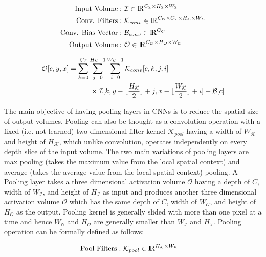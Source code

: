 \begin{align}
\text{Input Volume}:&~ \mathcal{I} \in \mathcal{\rm I\!R}^{C_{\mathcal{I}} \times H_{\mathcal{I}} \times W_{\mathcal{I}}}\\
\text{Conv. Filters}:&~ \mathcal{K}_{conv} \in \mathcal{\rm I\!R}^{C_{\mathcal{O}} \times C_{\mathcal{I}} \times H_{\mathcal{K}} \times W_{\mathcal{K}}}\\
\text{Conv. Bias Vector}:&~ \mathcal{B}_{conv} \in \mathcal{\rm I\!R}^{C_{\mathcal{O}}}\\
\text{Output Volume}:&~ \mathcal{O} \in \mathcal{\rm I\!R}^{C_{\mathcal{O}} \times H_{\mathcal{O}} \times W_{\mathcal{O}}}
\end{align}

\begin{equation}
\label{eqn:conv_operator}
\begin{split}
\mathcal{O}[c,y,x] &= \sum_{k=0}^{C_{\mathcal{I}}} \sum_{j=0}^{H_\mathcal{K}-1} \sum_{i=0}^{W_\mathcal{K}-1} \mathcal{K}_{conv}[c, k, j, i] \\ & \quad \quad \quad \times \mathcal{I}[k,y-\lfloor\frac{H_\mathcal{K}}{2}\rfloor+j,x-\lfloor\frac{W_\mathcal{K}}{2}\rfloor+i] + \mathcal{B}[c]
\end{split}
\end{equation}

The main objective of having pooling layers in CNNs is to reduce the spatial size of output volumes. Pooling can also be thought as a convolution operation with a fixed (i.e. not learned) two dimensional filter kernel $\mathcal{K}_{pool}$ having a width of $W_\mathcal{K}$ and height of $H_\mathcal{K}$, which unlike convolution, operates independently on every depth slice of the input volume. The two main variations of pooling layers are max pooling (takes the maximum value from the local spatial context) and average (takes the average value from the local spatial context) pooling. A Pooling layer takes a three dimensional activation volume $\mathcal{O}$ having a depth of $C$, width of $W_{\mathcal{I}}$, and height of $H_{\mathcal{I}}$ as input and produces another three dimensional activation volume $\mathcal{O}$ which has the same depth of $C$, width of $W_{\mathcal{O}}$, and height of $H_{\mathcal{O}}$ as the output. Pooling kernel is generally slided with more than one pixel at a time and hence $W_{\mathcal{O}}$ and $H_{\mathcal{O}}$ are generally smaller than $W_{\mathcal{I}}$ and $H_{\mathcal{I}}$. Pooling operation can be formally defined as follows:

\begin{align}
\text{Pool Filters}:&~ \mathcal{K}_{pool} \in \mathcal{\rm I\!R}^{H_{\mathcal{K}} \times W_{\mathcal{K}}}
\end{align}

